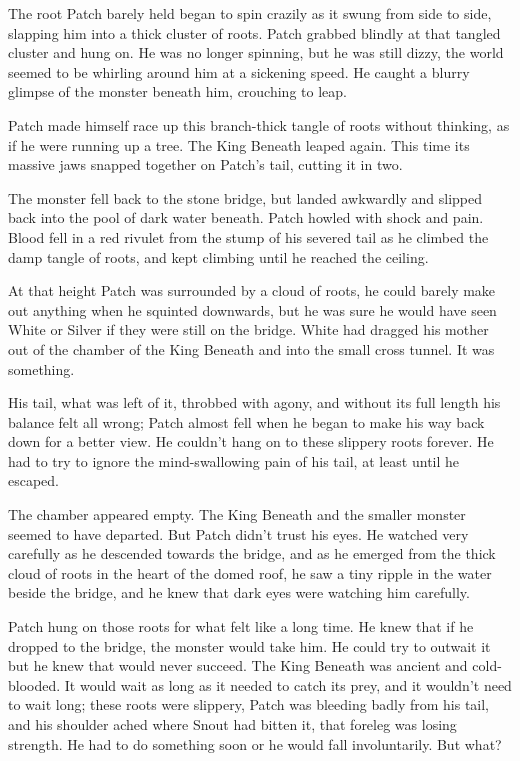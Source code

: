 \documentclass[12pt]{book}
\begin{document}
The root Patch barely held began to spin crazily as it swung from side to side, slapping him into a thick cluster of roots. Patch grabbed blindly at that tangled cluster and hung on. He was no longer spinning, but he was still dizzy, the world seemed to be whirling around him at a sickening speed. He caught a blurry glimpse of the monster beneath him, crouching to leap.\par
Patch made himself race up this branch-thick tangle of roots without thinking, as if he were running up a tree. The King Beneath leaped again. This time its massive jaws snapped together on Patch's tail, cutting it in two.\par
The monster fell back to the stone bridge, but landed awkwardly and slipped back into the pool of dark water beneath. Patch howled with shock and pain. Blood fell in a red rivulet from the stump of his severed tail as he climbed the damp tangle of roots, and kept climbing until he reached the ceiling.\par
At that height Patch was surrounded by a cloud of roots, he could barely make out anything when he squinted downwards, but he was sure he would have seen White or Silver if they were still on the bridge. White had dragged his mother out of the chamber of the King Beneath and into the small cross tunnel. It was something. \par
 His tail, what was left of it, throbbed with agony, and without its full length his balance felt all wrong; Patch almost fell when he began to make his way back down for a better view. He couldn't hang on to these slippery roots forever. He had to try to ignore the mind-swallowing pain of his tail, at least until he escaped.\par
The chamber appeared empty. The King Beneath and the smaller monster seemed to have departed. But Patch didn't trust his eyes. He watched very carefully as he descended towards the bridge, and as he emerged from the thick cloud of roots in the heart of the domed roof, he saw a tiny ripple in the water beside the bridge, and he knew that dark eyes were watching him carefully.\par
 Patch hung on those roots for what felt like a long time. He knew that if he dropped to the bridge, the monster would take him. He could try to outwait it %
 but he knew that would never succeed. The King Beneath was ancient and cold-blooded. It would wait as long as it needed to catch its prey, and it wouldn't need to wait long; these roots were slippery, Patch was bleeding badly from his tail, and his shoulder ached where Snout had bitten it, that foreleg was losing strength. He had to do something soon or he would fall involuntarily. But what?\par
\end{document}
